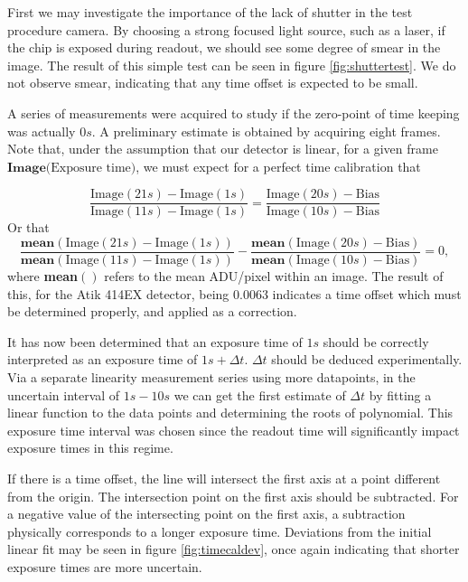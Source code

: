 \documentclass[../main.tex]{subfiles}
\begin{document}
	First we may investigate the importance of the lack of shutter in the test procedure camera. By choosing a strong focused light source, such as a laser, if the chip is exposed during readout, we should see some degree of smear in the image. The result of this simple test can be seen in figure \ref{fig:shuttertest}. We do not observe smear, indicating that any time offset is expected to be small.
	
	A series of measurements were acquired to study if the zero-point of time keeping was actually $0s$. A preliminary estimate is obtained by acquiring eight frames. Note that, under the assumption that our detector is linear, for a given frame $\textbf{Image(}\text{Exposure time}\textbf{)}$, we must expect for a perfect time calibration that 
	
	\begin{equation}
		\frac{\text{Image}(21s) - \text{Image}(1s)}{\text{Image}(11s) - \text{Image}(1s)} = \frac{\text{Image}(20s) - \text{Bias}}{\text{Image}(10s) - \text{Bias}}
	\end{equation}
	Or that 
	\begin{equation}
		\frac{\textbf{mean}(\text{Image}(21s) - \text{Image}(1s))}{\textbf{mean}(\text{Image}(11s) - \text{Image}(1s))} - \frac{\textbf{mean}(\text{Image}(20s) - \text{Bias})}{\textbf{mean}(\text{Image}(10s) - \text{Bias})} = 0,
	\end{equation}
	where \textbf{mean}$()$ refers to the mean ADU/pixel within an image. The result of this, for the Atik 414EX detector, being $0.0063$ indicates a time offset which must be determined properly, and applied as a correction. 
	
	It has now been determined that an exposure time of $1s$ should be correctly interpreted as an exposure time of $1s + \Delta t$. $\Delta t$ should be deduced experimentally. Via a separate linearity measurement series using more datapoints, in the uncertain interval of $1s - 10s$ we can get the first estimate of $\Delta t$ by fitting a linear function to the data points and determining the roots of polynomial. This exposure time interval was chosen since the readout time will significantly impact exposure times in this regime.
	
	If there is a time offset, the line will intersect the first axis at a point different from the origin. The intersection point on the first axis should be subtracted. For a negative value of the intersecting point on the first axis, a subtraction physically corresponds to a longer exposure time. Deviations from the initial linear fit may be seen in figure \ref{fig:timecaldev}, once again indicating that shorter exposure times are more uncertain. 
\end{document}

